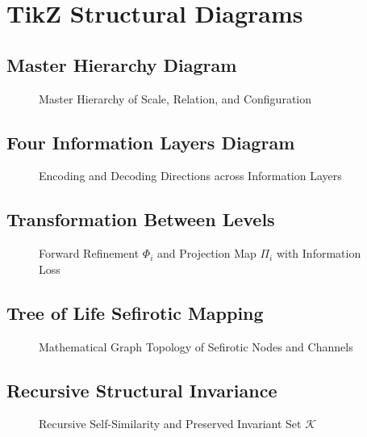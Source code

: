 \documentclass[11pt,a4paper,titlepage]{article}
\theoremstyle{definition}
\theoremstyle{remark}
\begin{document}
\appendix
\section{TikZ Structural Diagrams}
\label{appendix:tikz}

\subsection{Master Hierarchy Diagram}
\begin{figure}[h!]
\centering

\caption{Master Hierarchy of Scale, Relation, and Configuration}
\end{figure}

\subsection{Four Information Layers Diagram}
\begin{figure}[h!]
\centering

\caption{Encoding and Decoding Directions across Information Layers}
\end{figure}

\subsection{Transformation Between Levels}
\begin{figure}[h!]
\centering

\caption{Forward Refinement $\Phi_i$ and Projection Map $\Pi_i$ with Information Loss}
\end{figure}

\subsection{Tree of Life Sefirotic Mapping}
\begin{figure}[h!]
\centering

\caption{Mathematical Graph Topology of Sefirotic Nodes and Channels}
\end{figure}

\subsection{Recursive Structural Invariance}
\begin{figure}[h!]
\centering

\caption{Recursive Self-Similarity and Preserved Invariant Set $\mathcal{K}$}
\end{figure}

\nocite{*}


\end{document}
